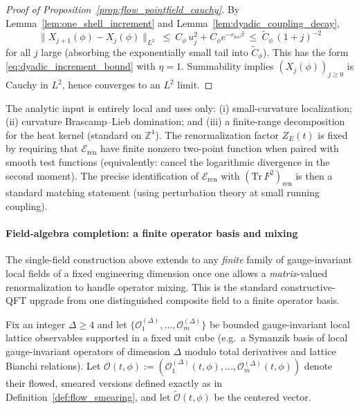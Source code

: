 \begin{proof}[Proof of Proposition~\ref{prop:flow_pointfield_cauchy}]
By Lemma~\ref{lem:one_shell_increment} and Lemma~\ref{lem:dyadic_coupling_decay},
\[
\|X_{j+1}(\phi)-X_j(\phi)\|_{L^2}\ \le\ C_\phi\,u_j^2 + C_\phi e^{-c_{\mathrm{loc}}\beta}
\ \le\ \widetilde C_\phi\,(1+j)^{-2}
\]
for all $j$ large (absorbing the exponentially small tail into $\widetilde C_\phi$).
This has the form \eqref{eq:dyadic_increment_bound} with $\eta=1$.
Summability implies $(X_j(\phi))_{j\ge 0}$ is Cauchy in $L^2$, hence converges to an $L^2$ limit.
\end{proof}

\begin{remark}
The analytic input is entirely local and uses only: (i) small-curvature localization; (ii) curvature Brascamp--Lieb domination; and 
(iii) a finite-range decomposition for the heat kernel (standard on $\mathbb Z^4$).
The renormalization factor $Z_E(t)$ is fixed by requiring that $\mathcal E_{\mathrm{ren}}$ have finite nonzero two-point function 
when paired with smooth test functions (equivalently: cancel the logarithmic divergence in the second moment).
The precise identification of $\mathcal E_{\mathrm{ren}}$ with $(\mathrm{Tr}\,F^2)_{\mathrm{ren}}$ is then a standard matching statement 
(using perturbation theory at small running coupling).
\end{remark}


\paragraph*{Field-algebra completion: a finite operator basis and mixing}

The single-field construction above extends to any \emph{finite} family of gauge-invariant local fields of a fixed engineering
dimension once one allows a \emph{matrix}-valued renormalization to handle operator mixing.
This is the standard constructive-QFT upgrade from one distinguished composite field to a finite operator basis.

Fix an integer $\Delta\ge 4$ and let $\{\mathcal O^{(\Delta)}_1,\dots,\mathcal O^{(\Delta)}_m\}$ be bounded gauge-invariant local lattice
observables supported in a fixed unit cube (e.g.\ a Symanzik basis of local gauge-invariant operators of dimension $\Delta$ modulo total
derivatives and lattice Bianchi relations).
Let $\mathbf{\mathcal O}(t,\phi):=(\mathcal O^{(\Delta)}_1(t,\phi),\dots,\mathcal O^{(\Delta)}_m(t,\phi))$ denote their flowed, smeared versions
defined exactly as in Definition~\ref{def:flow_smearing}, and let $\widetilde{\mathbf{\mathcal O}}(t,\phi)$ be the centered vector.

